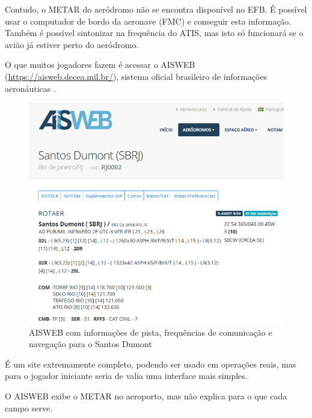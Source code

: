Contudo, o METAR do aeródromo não se encontra disponível no EFB.
É possível usar o computador de bordo da aeronave (FMC) e conseguir
esta informação. Também é possível sintonizar na frequência do ATIS,
mas isto só funcionará se o avião já estiver perto do aeródromo.

O que muitos jogadores fazem é acessar o AISWEB (\url{https://aisweb.decea.mil.br/}), sistema oficial brasileiro
de informações aeronáuticas \cite{AISWEB}. 

\begin{figure}[ht]
    \begin{center}
    \includegraphics[width=400pt]{img/aisweb.png}
    \caption{AISWEB com informações de pista, frequências de comunicação e navegação para o Santos Dumont}
    \label{fig:aisweb}
    \end{center}
\end{figure}

É um site extremamente completo, podendo
ser usado em operações reais, mas para o jogador iniciante seria 
de valia uma interface mais simples.

O AISWEB exibe o METAR no aeroporto, mas não explica para o que cada campo serve.

